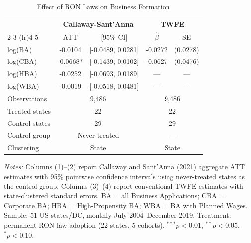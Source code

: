 \begin{table}[t]
\centering
\caption{Effect of RON Laws on Business Formation}
\label{tab:main}
\begin{tabular}{l cc cc}
\hline\hline
 & \multicolumn{2}{c}{Callaway-Sant'Anna} & \multicolumn{2}{c}{TWFE} \\
\cmidrule(lr){2-3} \cmidrule(lr){4-5}
 & ATT & [95\% CI] & $\hat{\beta}$ & SE \\
\hline
log(BA) & -0.0104 & [-0.0489, 0.0281] & -0.0272 & (0.0278) \\
log(CBA) & -0.0668* & [-0.1439, 0.0102] & -0.0627 & (0.0476) \\
log(HBA) & -0.0252 & [-0.0693, 0.0189] & --- & --- \\
log(WBA) & -0.0019 & [-0.0518, 0.0481] & --- & --- \\
\hline
Observations & \multicolumn{2}{c}{9,486} & \multicolumn{2}{c}{9,486} \\
Treated states & \multicolumn{2}{c}{22} & \multicolumn{2}{c}{22} \\
Control states & \multicolumn{2}{c}{29} & \multicolumn{2}{c}{29} \\
Control group & \multicolumn{2}{c}{Never-treated} & \multicolumn{2}{c}{---} \\
Clustering & \multicolumn{2}{c}{State} & \multicolumn{2}{c}{State} \\
\hline\hline
\end{tabular}
\begin{tablenotes}[flushleft]
\small
\item \textit{Notes:} Columns (1)--(2) report Callaway and Sant'Anna (2021) aggregate ATT estimates with 95\% pointwise confidence intervals using never-treated states as the control group. Columns (3)--(4) report conventional TWFE estimates with state-clustered standard errors. BA = all Business Applications; CBA = Corporate BA; HBA = High-Propensity BA; WBA = BA with Planned Wages. Sample: 51 US states/DC, monthly July 2004--December 2019. Treatment: permanent RON law adoption (22 states, 5 cohorts). $^{***}p<0.01$, $^{**}p<0.05$, $^{*}p<0.10$.
\end{tablenotes}
\end{table}

